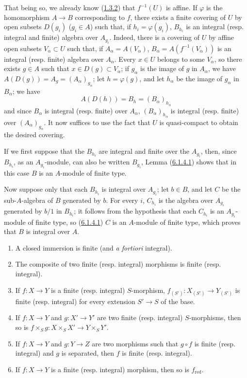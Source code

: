 That being so, we already know (\hyperref[II.1.3.2]{1.3.2}) that
$f^{-1}(U)$ is affine. If $\varphi$ is the homomorphism $A\to B$
corresponding to $f$, there exists a finite covering of $U$ by open subsets
$D(g_i)$ ($g_i\in A$) such that, if $h_i=\varphi(g_i)$, $B_{h_i}$ is an
integral (resp. integral and finite) algebra over $A_{g_i}$. Indeed, there
is a covering of $U$ by affine open subsets $V_\alpha\subset U$ such that, if
$A_\alpha=A(V_\alpha)$, $B_\alpha=A(f^{-1}(V_\alpha))$ is an integral (resp.
finite) algebra over $A_\alpha$. Every $x\in U$ belongs to some
$V_\alpha$, so there exists $g\in A$ such that $x\in D(g)\subset V_\alpha$;
if $g_\alpha$ is the image of $g$ in $A_\alpha$, we have
$A(D(g))=A_g=(A_\alpha)_{g_\alpha}$; let $h=\varphi(g)$, and let $h_\alpha$
be the image of $g_\alpha$ in $B_\alpha$; we have
\[
A(D(h))=B_h=(B_\alpha)_{h_\alpha}
\]
and since $B_\alpha$ is integral (resp. finite) over $A_\alpha$,
$(B_\alpha)_{h_\alpha}$ is integral (resp. finite) over
$(A_\alpha)_{g_\alpha}$. It now suffices to use the fact that $U$ is
quasi-compact to obtain the desired covering.

If we first suppose that the $B_{h_i}$ are integral and finite over the
$A_{g_i}$, then, since $B_{h_i}$, as an $A_{g_i}$-module, can also be
written $B_{g_i}$, Lemma (\hyperref[II.6.1.4.1]{6.1.4.1}) shows that in
this case $B$ is an $A$-module of finite type.

Now suppose only that each $B_{h_i}$ is integral over $A_{g_i}$; let
$b\in B$, and let $C$ be the sub-$A$-algebra of $B$ generated by $b$. For
every $i$, $C_{h_i}$ is the algebra over $A_{g_i}$ generated by $b/1$ in
$B_{h_i}$; it follows from the hypothesis that each $C_{h_i}$ is an
$A_{g_i}$-module of finite type, so
(\hyperref[II.6.1.4.1]{6.1.4.1}) $C$ is an $A$-module of finite type,
which proves that $B$ is integral over $A$.

\begin{proposition}[6.1.5]
\label{II.6.1.5}
\begin{enumerate}
\item[(i)] A closed immersion is finite (and \emph{a fortiori} integral).
\item[(ii)] The composite of two finite (resp. integral) morphisms is finite
(resp. integral).
\item[(iii)] If $f:X\to Y$ is a finite (resp. integral) $S$-morphism,
$f_{(S')}:X_{(S')}\to Y_{(S')}$ is finite (resp. integral) for every
extension $S'\to S$ of the base.
\item[(iv)] If $f:X\to Y$ and $g:X'\to Y'$ are two finite (resp. integral)
$S$-morphisms, then so is
$f\times_S g:X\times_S X'\to Y\times_S Y'$.
\item[(v)] If $f:X\to Y$ and $g:Y\to Z$ are two morphisms such that $g\circ
f$ is finite (resp. integral) and $g$ is separated, then $f$ is finite
(resp. integral).
\item[(vi)] If $f:X\to Y$ is a finite (resp. integral) morphism, then so is
$f_{\mathrm{red}}$.
\end{enumerate}
\end{proposition}

